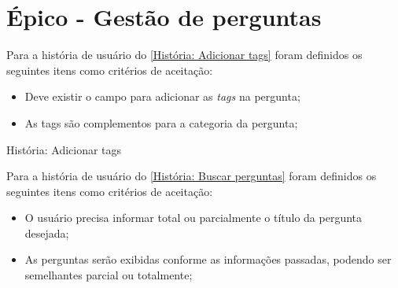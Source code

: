 \section{Épico - Gestão de perguntas}
\label{gestão_perguntas}

Para a história de usuário do \autoref{História: Adicionar tags} foram definidos os seguintes itens como critérios de aceitação:

\begin{itemize}
\item Deve existir o campo para adicionar as \textit{tags} na pergunta;
\item As tags são complementos para a categoria da pergunta; 
\end{itemize}

\def\arraystretch{2}
\begin{quadro}[htb]
\centering
\ABNTEXfontereduzida
\caption[História: Adicionar tags]{História: Adicionar tags}
\label{História: Adicionar tags}
\end{quadro}
\FloatBarrier 

Para a história de usuário do \autoref{História: Buscar perguntas} foram definidos os seguintes itens como critérios de aceitação:

\begin{itemize}
\item O usuário precisa informar total ou parcialmente o título da pergunta desejada;
\item As perguntas serão exibidas conforme as informações passadas, podendo ser semelhantes parcial ou totalmente;
\end{itemize}

